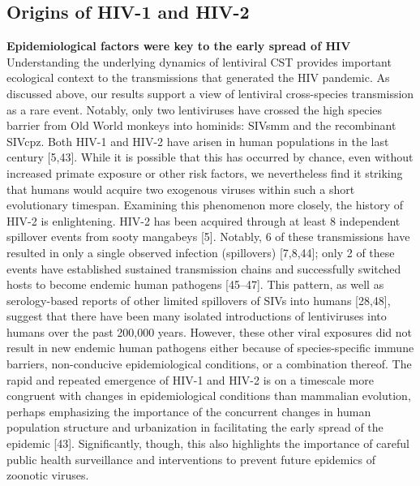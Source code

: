 \subsection*{Origins of HIV-1 and HIV-2}
\textbf{Epidemiological factors were key to the early spread of HIV}\\
Understanding the underlying dynamics of lentiviral CST provides important ecological context to the transmissions that generated the HIV pandemic.
As discussed above, our results support a view of lentiviral cross-species transmission as a rare event.
Notably, only two lentiviruses have crossed the high species barrier from Old World monkeys into hominids: SIVsmm and the recombinant SIVcpz.
Both HIV-1 and HIV-2 have arisen in human populations in the last century [5,43].
While it is possible that this has occurred by chance, even without increased primate exposure or other risk factors, we nevertheless find it striking that humans would acquire two exogenous viruses within such a short evolutionary timespan.
Examining this phenomenon more closely, the history of HIV-2 is enlightening.
HIV-2 has been acquired through at least 8 independent spillover events from sooty mangabeys [5].
Notably, 6 of these transmissions have resulted in only a single observed infection (spillovers) [7,8,44]; only 2 of these events have established sustained transmission chains and successfully switched hosts to become endemic human pathogens [45–47].
This pattern, as well as serology-based reports of other limited spillovers of SIVs into humans [28,48], suggest that there have been many isolated introductions of lentiviruses into humans over the past 200,000 years.
However, these other viral exposures did not result in new endemic human pathogens either because of species-specific immune barriers, non-conducive epidemiological conditions, or a combination thereof.
The rapid and repeated emergence of HIV-1 and HIV-2 is on a timescale more congruent with changes in epidemiological conditions than mammalian evolution, perhaps emphasizing the importance of the concurrent changes in human population structure and urbanization in facilitating the early spread of the epidemic [43].
Significantly, though, this also highlights the importance of careful public health surveillance and interventions to prevent future epidemics of zoonotic viruses.

